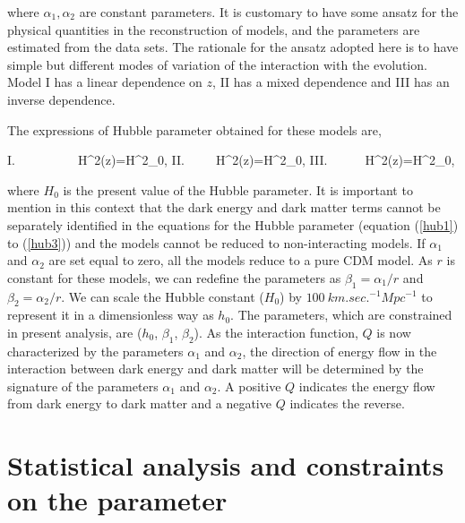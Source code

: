 \documentclass[11pt]{article}
\begin{document}
where $\alpha_1 , \alpha_2$ are constant parameters. It is customary to have some ansatz for the physical quantities in the reconstruction of models, and the parameters are estimated from the data sets. The rationale for the ansatz adopted here is to have simple but different modes of variation of the interaction with the evolution. Model I has a linear dependence on $z$, II has a mixed dependence and III has an inverse dependence.

The expressions of Hubble parameter obtained for these models are,

\be
I.~~~~~~~~~~H^2(z)=H^2_0,
\label{hub1}
\ee   
\be
II.~~~~~H^2(z)=H^2_0,
\label{hub2}
\ee  
\be
III.~~~~~~H^2(z)=H^2_0,
\label{hub3}
\ee 

where $H_0$ is the present value of the Hubble parameter. It is important to mention in this context that the dark energy and dark matter terms cannot be separately identified in the equations for the Hubble parameter (equation (\ref{hub1}) to (\ref{hub3})) and the models cannot be reduced to non-interacting models. If $\alpha_1$ and $\alpha_2$ are set equal to zero, all the models reduce to a pure CDM model. As $r$ is constant for these models, we can redefine the parameters as $\beta_1=\alpha_1/r$ and $\beta_2=\alpha_2/r$. We can scale the Hubble constant ($H_0$) by $100~km.sec.^{-1}Mpc^{-1}$ to represent it in a dimensionless way as $h_0$. The parameters, which are constrained in present analysis, are ($h_0$, $\beta_1$, $\beta_2$). As the interaction function, $Q$ is now characterized by the parameters $\alpha_1$ and $\alpha_2$, the direction of energy flow in the interaction between dark energy and dark matter will be determined by the signature of the parameters $\alpha_1$ and $\alpha_2$. A positive $Q$ indicates the energy flow from dark energy to dark matter and a negative $Q$ indicates the reverse. 














\section{Statistical analysis and constraints on the parameter}
\label{stat}
\end{document}
